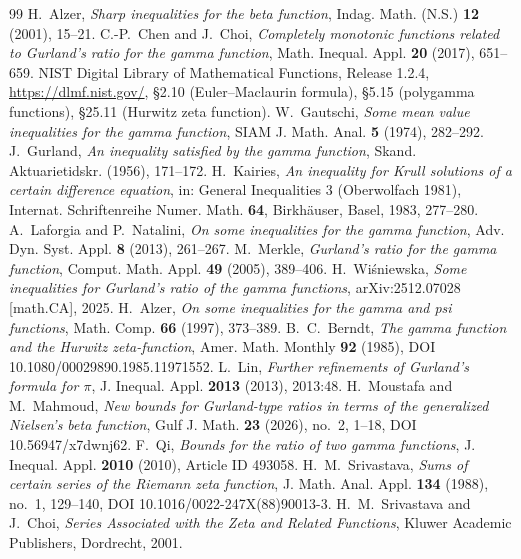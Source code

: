 \begin{thebibliography}{99}
 H.~Alzer, \emph{Sharp inequalities for the beta function}, Indag. Math.
(N.S.) \textbf{12} (2001), 15--21.
 C.-P.~Chen and J.~Choi, \emph{Completely monotonic functions related
to Gurland's ratio for the gamma function}, Math. Inequal. Appl. \textbf{20} (2017),
651--659.
 NIST Digital Library of Mathematical Functions, Release 1.2.4,
\url{https://dlmf.nist.gov/}, \S2.10 (Euler--Maclaurin formula), \S5.15 (polygamma
functions), \S25.11 (Hurwitz zeta function).
 W.~Gautschi, \emph{Some mean value inequalities for the gamma
function}, SIAM J. Math. Anal. \textbf{5} (1974), 282--292.
 J.~Gurland, \emph{An inequality satisfied by the gamma function},
Skand. Aktuarietidskr. (1956), 171--172.
 H.~Kairies, \emph{An inequality for Krull solutions of a certain
difference equation}, in: General Inequalities 3 (Oberwolfach 1981), Internat.
Schriftenreihe Numer. Math. \textbf{64}, Birkh\"auser, Basel, 1983, 277--280.
 A.~Laforgia and P.~Natalini, \emph{On some inequalities for
the gamma function}, Adv. Dyn. Syst. Appl. \textbf{8} (2013), 261--267.
 M.~Merkle, \emph{Gurland's ratio for the gamma function},
Comput. Math. Appl. \textbf{49} (2005), 389--406.
 H.~Wi\'sniewska, \emph{Some inequalities for Gurland's ratio of the
gamma functions}, arXiv:2512.07028 [math.CA], 2025.
 H.~Alzer, \emph{On some inequalities for the gamma and psi functions},
Math. Comp. \textbf{66} (1997), 373--389.
 B.~C.~Berndt, \emph{The gamma function and the Hurwitz zeta-function},
Amer. Math. Monthly \textbf{92} (1985), DOI 10.1080/00029890.1985.11971552.
 L.~Lin, \emph{Further refinements of Gurland's formula for $\pi$},
J. Inequal. Appl. \textbf{2013} (2013), 2013:48.
 H.~Moustafa and M.~Mahmoud, \emph{New bounds for Gurland-type
ratios in terms of the generalized Nielsen's beta function}, Gulf J. Math. \textbf{23}
(2026), no.~2, 1--18, DOI 10.56947/x7dwnj62.
 F.~Qi, \emph{Bounds for the ratio of two gamma functions},
J. Inequal. Appl. \textbf{2010} (2010), Article ID 493058.
 H.~M.~Srivastava, \emph{Sums of certain series of the Riemann zeta
function}, J. Math. Anal. Appl. \textbf{134} (1988), no.~1, 129--140,
DOI 10.1016/0022-247X(88)90013-3.
 H.~M.~Srivastava and J.~Choi, \emph{Series Associated with the
Zeta and Related Functions}, Kluwer Academic Publishers, Dordrecht, 2001.

\end{thebibliography}
